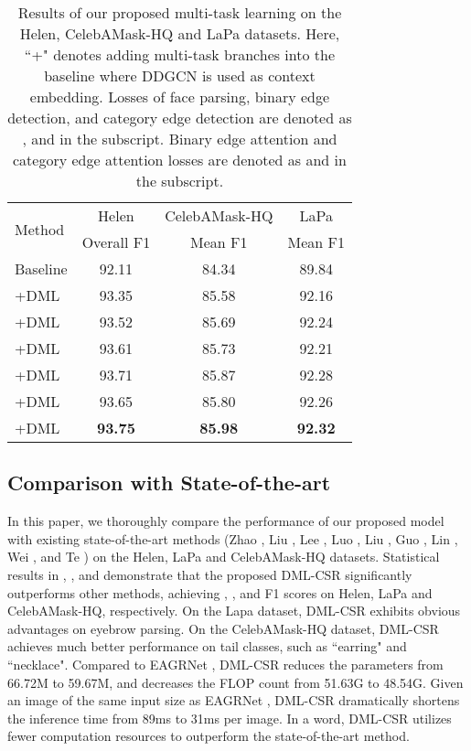 \documentclass[10pt,twocolumn,letterpaper]{article}
\begin{document}
\begin{table}
  \small
  \centering
  \begin{tabular}[width=\linewidth]{ l|c|c|c } 
    \hline 
    \multirow{2}{4em}{Method} & {\footnotesize Helen} & {\footnotesize CelebAMask-HQ} & {\footnotesize LaPa}  \\
& {\footnotesize Overall F1} & {\footnotesize Mean F1} & {\footnotesize Mean F1}  \\
    \hline \hline
Baseline & 92.11 & 84.34 & 89.84 \\\hline
+DML  & 93.35 & 85.58 & 92.16 \\
+DML & 93.52 & 85.69  & 92.24   \\
+DML &  93.61 &  85.73 &  92.21\\ 
+DML  & 93.71 & 85.87 & 92.28 \\ 
+DML  & 93.65 & 85.80 & 92.26 \\ 
\hline
+DML  & \textbf{93.75} & \textbf{85.98} & \textbf{92.32} \\ 
\hline
\end{tabular}
\vspace{-2.5mm}
\caption{Results of our proposed multi-task learning on the Helen, CelebAMask-HQ and LaPa datasets. Here, ``+" denotes adding multi-task branches into the baseline where DDGCN is used as context embedding. Losses of face parsing, binary edge detection, and category edge detection are denoted as ,  and  in the subscript. Binary edge attention and category edge attention losses are denoted as  and  in the subscript.}
\label{tab:multi_task}
\vspace{-5mm}
\end{table}

\subsection{Comparison with State-of-the-art}
In this paper, we thoroughly compare the performance of our proposed model with existing state-of-the-art methods (\ie Zhao \etal \cite{psp}, Liu \etal \cite{lapa}, Lee \etal \cite{CelebAMask-HQ}, Luo \etal \cite{ehanet}, Liu \etal \cite{lius}, Guo \etal \cite{guo2018}, Lin \etal \cite{roiTanh}, Wei \etal \cite{wei_tip}, and Te \etal \cite{te2020edge}) on the Helen, LaPa and CelebAMask-HQ datasets. 
Statistical results in \tableautorefname { \ref{tab:comparision_helen}},  \tableautorefname { \ref{tab:comparision_lapa}}, and \tableautorefname { \ref{tab:comparision_celebA}} demonstrate that the proposed DML-CSR significantly outperforms other methods, achieving , , and  F1 scores on Helen, LaPa and CelebAMask-HQ, respectively. 
On the Lapa dataset, DML-CSR exhibits obvious advantages on eyebrow parsing. 
On the CelebAMask-HQ dataset, DML-CSR achieves much better performance on tail classes, such as ``earring" and ``necklace". 
Compared to EAGRNet \cite{te2020edge}, DML-CSR reduces the parameters from 66.72M to 59.67M, and decreases the FLOP count from 51.63G to 48.54G. Given an image of the same input size as EAGRNet \cite{te2020edge}, DML-CSR dramatically shortens the inference time from 89ms to 31ms per image. In a word, DML-CSR utilizes fewer computation resources to outperform the state-of-the-art method.
\end{document}
